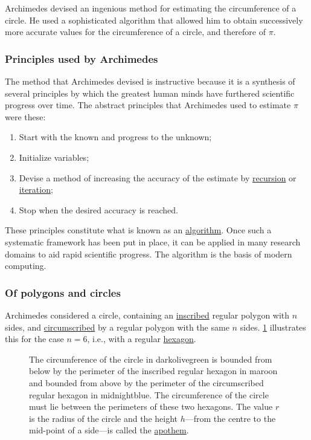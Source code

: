 \documentclass[
  a4paper,
]{article}
\begin{document}
Archimedes devised an ingenious method for estimating the circumference
of a circle. He used a sophisticated algorithm that allowed him to
obtain successively more accurate values for the circumference of a
circle, and therefore of \(\pi\).

\subsubsection{Principles used by
Archimedes}\label{principles-used-by-archimedes}

The method that Archimedes devised is instructive because it is a
synthesis of several principles by which the greatest human minds have
furthered scientific progress over time. The abstract principles that
Archimedes used to estimate \(\pi\) were these:

\begin{enumerate}
\item
  Start with the known and progress to the unknown;
\item
  Initialize variables;
\item
  Devise a method of increasing the accuracy of the estimate by
  \href{https://mathworld.wolfram.com/Recursion.html}{recursion} or
  \href{https://www.vocabulary.com/dictionary/iteration}{iteration};
\item
  Stop when the desired accuracy is reached.
\end{enumerate}

These principles constitute what is known as an
\href{https://www.merriam-webster.com/dictionary/algorithm}{algorithm}.
Once such a systematic framework has been put in place, it can be
applied in many research domains to aid rapid scientific progress. The
algorithm is the basis of modern computing.

\subsubsection{Of polygons and circles}\label{of-polygons-and-circles}

Archimedes considered a circle, containing an
\href{https://mathworld.wolfram.com/Inscribed.html}{inscribed} regular
polygon with \(n\) sides, and
\href{https://mathworld.wolfram.com/Circumscribed.html}{circumscribed}
by a regular polygon with the same \(n\) sides. \cref{fig:two-limits}
illustrates this for the case \(n = 6\), i.e., with a regular
\href{https://www.britannica.com/science/hexagon}{hexagon}.

\begin{figure}
\centering

\caption{The circumference of the circle in darkolivegreen is bounded
from below by the perimeter of the inscribed regular hexagon in maroon
and bounded from above by the perimeter of the circumscribed regular
hexagon in midnightblue. The circumference of the circle must lie
between the perimeters of these two hexagons. The value \(r\) is the
radius of the circle and the height \(h\)---from the centre to the
mid-point of a side---is called the
\href{https://en.wikipedia.org/wiki/Apothem}{apothem}.}\label{fig:two-limits}
\end{figure}
\end{document}
